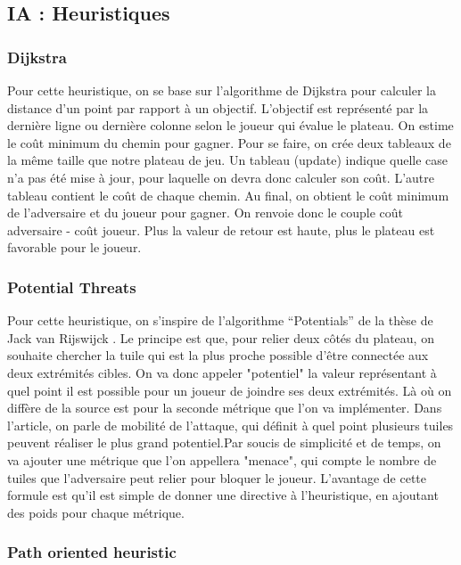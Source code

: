 \documentclass[12pt]{article}
\begin{document}
\subsection{IA : Heuristiques} \label{heuristiques}

\subsubsection{Dijkstra} \label{algo-dijkstra}

Pour cette heuristique, on se base sur l’algorithme de Dijkstra \cite{dijk} pour calculer la distance d’un point par rapport à un objectif. L'objectif est représenté par la dernière ligne ou dernière colonne selon le joueur qui évalue le plateau. On estime le coût minimum du chemin pour gagner. Pour se faire, on crée deux tableaux de la même taille que notre plateau de jeu. Un tableau (update) indique quelle case n’a pas été mise à jour, pour laquelle on devra donc calculer son coût. L’autre tableau contient le coût de chaque chemin. Au final, on obtient le coût minimum de l’adversaire et du joueur pour gagner. On renvoie donc le couple coût adversaire - coût joueur. Plus la valeur de retour est haute, plus le plateau est favorable pour le joueur.

\subsubsection{Potential Threats}

Pour cette heuristique, on s'inspire de l'algorithme “Potentials” de la thèse de Jack van Rijswijck \cite{RJ00}. Le principe est que, pour relier deux côtés du plateau, on souhaite chercher la tuile qui est la plus proche possible d’être connectée aux deux extrémités cibles. On va donc appeler "potentiel" la valeur représentant à quel point il est possible pour un joueur de joindre ses deux extrémités. Là où on diffère de la source est pour la seconde métrique que l’on va implémenter. Dans l’article, on parle de mobilité de l’attaque, qui définit à quel point plusieurs tuiles peuvent réaliser le plus grand potentiel.Par soucis de simplicité et de temps, on va ajouter une métrique que l’on appellera "menace", qui compte le nombre de tuiles que l’adversaire peut relier pour bloquer le joueur. L’avantage de cette formule est qu'il est simple de donner une directive à l’heuristique, en ajoutant des poids pour chaque métrique.

\subsubsection{Path oriented heuristic} \label{path_oritented}
\end{document}
